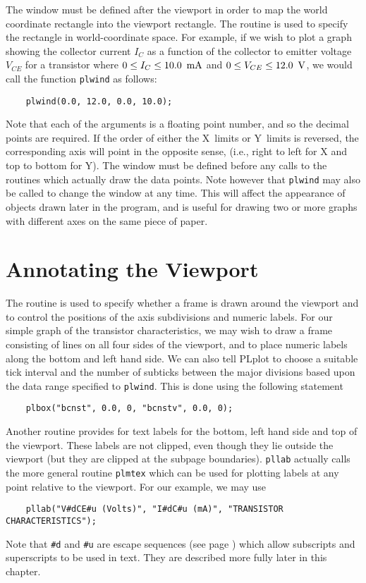 The window must be defined after the viewport in order to map the world
coordinate rectangle into the viewport rectangle. The routine
 is used to specify the rectangle in world-coordinate space.
For example, if we wish to plot a graph showing the collector current
$I_C$ as a function of the collector to emitter voltage $V_{CE}$ for a
transistor where $0\le I_C\le 10.0\mbox{\, mA}$ and $0\le V_{CE}\le
12.0\mbox{\, V}$, we would call the function {\tt plwind} as follows:
\begin{verbatim}
    plwind(0.0, 12.0, 0.0, 10.0);
\end{verbatim}
Note that each of the arguments is a floating point number, and so the
decimal points are required. If the order of either the X~limits or
Y~limits is reversed, the corresponding axis will point in the opposite
sense, (i.e., right to left for X and top to bottom for Y). The window
must be defined before any calls to the routines which actually draw the
data points. Note however that {\tt plwind} may also be called to change
the window at any time. This will affect the appearance of objects drawn
later in the program, and is useful for drawing two or more graphs with
different axes on the same piece of paper.


\section {Annotating the Viewport} \label{annotate}

The routine  is used to specify whether a frame is drawn around
the viewport and to control the positions of the axis subdivisions and
numeric labels. For our simple graph of the transistor characteristics, 
we may wish to draw a frame consisting of lines on all four sides of the
viewport, and to place numeric labels along the bottom and left hand side.
We can also tell PLplot to choose a suitable tick interval and
the number of subticks between the major divisions based upon the
data range specified to {\tt plwind}. This is done using the following
statement
\begin{verbatim}
    plbox("bcnst", 0.0, 0, "bcnstv", 0.0, 0);
\end{verbatim}
Another routine  provides for text labels for the bottom, 
left hand side and top of the viewport. These labels are not clipped, 
even though they lie outside the viewport (but they are clipped at the
subpage boundaries). {\tt pllab} actually calls the more general routine
{\tt plmtex} which can be used for plotting labels at any point relative
to the viewport. For our example, we may use
\begin{verbatim}
    pllab("V#dCE#u (Volts)", "I#dC#u (mA)", "TRANSISTOR CHARACTERISTICS");
\end{verbatim}
Note that \verb+#d+ and \verb+#u+ are escape sequences (see page
\pageref{escape}) which allow subscripts and superscripts to be used in
text.  They are described more fully later in this chapter.

